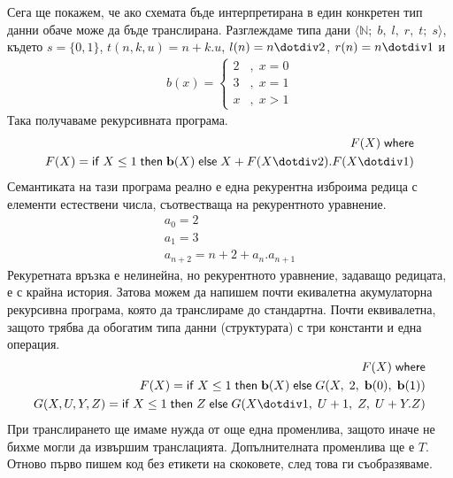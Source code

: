 \documentclass[14pt]{extarticle}
\begin{document}
Сега ще покажем, че ако схемата бъде интерпретирана в един конкретен тип данни обаче може да бъде транслирана. Разглеждаме типа дани \(\langle \mathbb N;\; b,\; l,\; r,\; t;\; s \rangle \),
където \(s = \{0, 1\}\), \(t(n, k, u) = n + k.u\), \(l(n) = n \dotdiv 2\), \(r(n) = n \dotdiv 1\) и
\begin{align*}
    b(x) = \begin{cases}
        2 &,\; x = 0 \\
        3 &,\; x = 1 \\
        x &, \; x > 1
    \end{cases}
\end{align*}
Така получаваме рекурсивната програма.
\begin{align*}
    F(X) \; \mathsf{where} \\
    F(X) = \mathsf{if} \; X \leq 1 \; \mathsf{then} \; \mathbf{b}(X)  \; \mathsf{else} \; X + F(X \dotdiv 2).F(X \dotdiv 1)
\end{align*}
Семантиката на тази програма реално е една рекурентна изброима редица с елементи естествени числа, съотвестваща на рекурентното уравнение.
\begin{align*}
    a_0 = 2 \\
    a_1 = 3 \\
    a_{n + 2} = n + 2 + a_n.a_{n + 1}
\end{align*}
Рекуретната връзка е нелинейна, но рекурентното уравнение, задаващо редицата, е с крайна история.
Затова можем да напишем почти екивалетна акумулаторна рекурсивна програма, която да транслираме до стандартна. Почти еквивалетна, защото трябва да обогатим типа данни (структурата) с три константи и една операция.
\begin{align*}
    F(X) \; \mathsf{where} \\
    F(X) = \mathsf{if} \; X \leq 1 \; \mathsf{then} \; \mathbf{b}(X)  \; \mathsf{else} \; G(X, \;  2,\; \mathbf{b}(0),\; \mathbf{b}(1)) \\
    G(X, U, Y, Z) = \mathsf{if} \; X \leq 1 \; \mathsf{then} \; Z  \; \mathsf{else} \; G(X \dotdiv 1,\;  U + 1,\; Z,\; U + Y.Z)
\end{align*}
При транслирането ще имаме нужда от още една променлива, защото иначе не бихме могли да извършим транслацията. Допълнителната променлива ще е \(T\). Отново първо пишем код без етикети на скоковете, след това ги съобразяваме.
\end{document}
